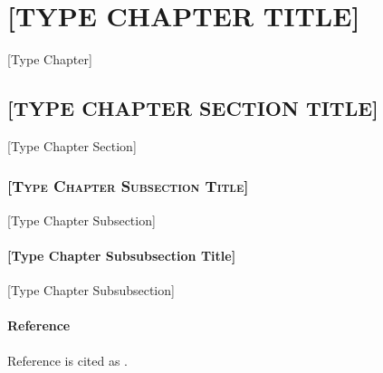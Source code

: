 \chapter{\MakeUppercase{[Type Chapter Title]}}
[Type Chapter]
\section{\MakeUppercase{[Type Chapter Section Title]}}
[Type Chapter Section]
\subsection{\textsc{[Type Chapter Subsection Title]}}
[Type Chapter Subsection]
\subsubsection{[Type Chapter Subsubsection Title]}
[Type Chapter Subsubsection]
\subsubsection{Reference}
Reference is cited as \cite{HP2000}.